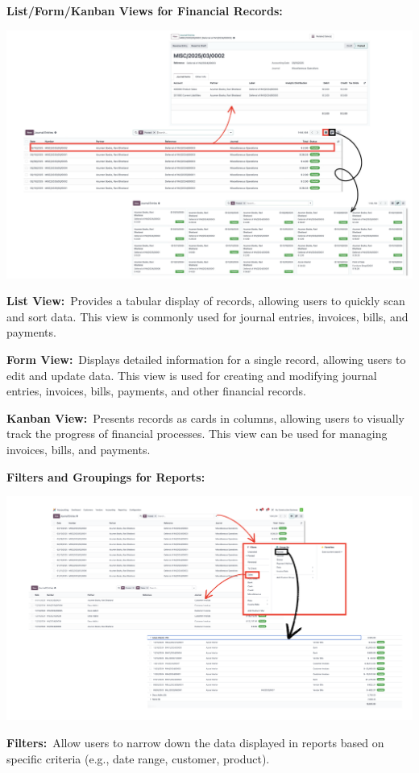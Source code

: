 \documentclass[11pt,a4paper]{article}
\begin{document}
\noindent\textbf{List/Form/Kanban Views for Financial Records:}
\begin{center}
    \includegraphics[width=0.8\linewidth]{diagram/UI_one.png}
\end{center}

\noindent\textbf{List View:} Provides a tabular display of records, allowing users to quickly scan and sort data. 
This view is commonly used for journal entries, invoices, bills, and payments.
\medskip

\noindent\textbf{Form View:} Displays detailed information for a single record, allowing users to edit and update 
data. This view is used for creating and modifying journal entries, invoices, bills, payments, and 
other financial records.
\medskip

\noindent\textbf{Kanban View:} Presents records as cards in columns, allowing users to visually track the 
progress of financial processes. This view can be used for managing invoices, bills, and 
payments.
\bigskip

\noindent\textbf{Filters and Groupings for Reports:}
\begin{center}
    \includegraphics[width=0.8\linewidth]{diagram/UI_two.png}
\end{center}

\noindent\textbf{Filters:} Allow users to narrow down the data displayed in reports based on specific criteria (e.g., 
date range, customer, product).
\medskip
\end{document}
